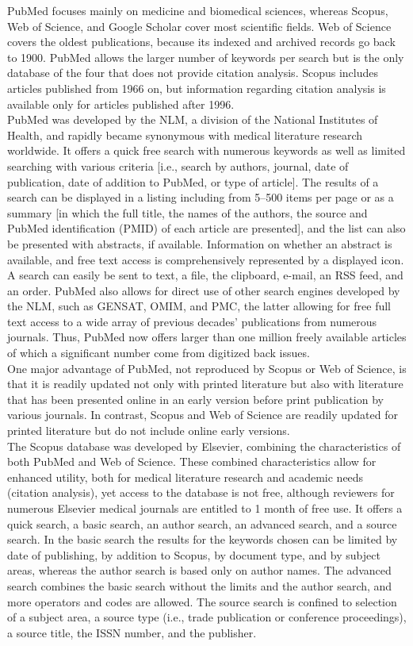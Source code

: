 \begin{enumerate}
	PubMed focuses mainly on medicine and biomedical sciences, whereas Scopus, Web of Science, and Google Scholar cover most scientific fields. Web of Science
	covers the oldest publications, because its indexed and archived records go back to 1900. PubMed allows the larger number of keywords per search but is the only database of the four that does not provide citation analysis. Scopus includes articles published from 1966 on, but information regarding citation analysis is available only for articles published after 1996.\\
	PubMed was developed by the NLM, a division of the National Institutes of Health, and rapidly became synonymous with medical literature research worldwide. It 	offers a quick free search with numerous keywords as well as limited searching with various criteria [i.e., search by authors, journal, date of publication, date of addition to PubMed, or type of article]. The results of	a search can be displayed in a listing including from 5–500 items per page or as a summary [in which the full title, the names of the authors, the source and PubMed identification (PMID) of each article are presented],
	and the list can also be presented with abstracts, if available. Information on whether an abstract is available, and free text access is comprehensively represented by a displayed icon. A search can easily be sent to text, a file, the clipboard, e-mail, an RSS feed, and an 	order. PubMed also allows for direct use of other search engines developed by the NLM, such as GENSAT,
	OMIM, and PMC, the latter allowing for free full text access to a wide array of previous decades’ publications from numerous journals. Thus, PubMed now offers larger than one million freely available articles of which a significant
	number come from digitized back issues. \\
	One major advantage of PubMed, not reproduced by Scopus or Web of Science, is that it is readily updated 	not only with printed literature but also with literature 	that has been presented online in an early version before print publication by various journals. In contrast, Scopus and Web of Science are readily updated for printed literature but do not include online early
	versions.\\
	The Scopus database was developed by Elsevier, combining the characteristics of both PubMed and Web of Science. These combined characteristics allow
	for enhanced utility, both for medical literature research and academic needs (citation analysis), yet access to the database is not free, although reviewers for numerous Elsevier medical journals are entitled to 1 month of free use. It offers a quick search, a basic search, an author search, an advanced search, and a source search. In the basic search the results for the keywords chosen can be limited by date of publishing, by addition to Scopus, by document type, and by subject areas, whereas the author search is based only on author names. The advanced search combines the basic search without the limits and the author search, and more operators and codes are allowed. The source search is confined to selection of a subject area, a source type (i.e., trade publication or conference proceedings), a source title, the ISSN number, and the publisher.\\

\end{enumerate}
